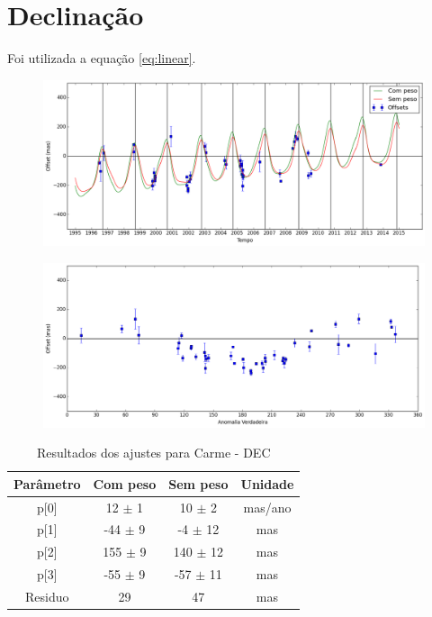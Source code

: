 \documentclass[11pt,a4paper]{report}
\begin{document}
\section*{Declinação}

Foi utilizada a equação \ref{eq:linear}.

\begin{figure}[h]
\includegraphics[scale=0.45]{Carme/DEC.png} 
\end{figure}

\begin{figure}[h]
\includegraphics[scale=0.45]{Carme/DEC_anom.png}  
\end{figure}

\begin{table}[h!]
\caption{\label{Tab: Carme-DEC} Resultados dos ajustes para Carme - DEC}
\begin{centering}
\begin{tabular}{cccc}
\hline
\hline
Parâmetro & Com peso & Sem peso & Unidade\tabularnewline
\hline
p[0] & 12 $\pm$ 1 & 10 $\pm$ 2 & mas/ano\\
p[1] & -44 $\pm$ 9 & -4 $\pm$ 12 & mas\\
p[2] & 155 $\pm$ 9 & 140 $\pm$ 12 & mas\\
p[3] & -55 $\pm$ 9 & -57 $\pm$ 11 & mas\\
Residuo & 29 & 47 & mas\\
\hline 
\end{tabular} 
\par\end{centering}
\end{table}
\end{document}
